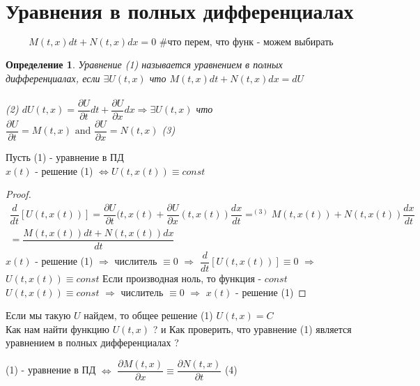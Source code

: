 \documentclass[12pt,a4paper,hidelinks]{article}            %
\newcommand{\pd}[2]{\dfrac{\partial #1}{\partial #2}}
\newcommand{\dd}[2]{\dfrac{d #1}{d #2}}
\newtheorem*{mdef}{Определение}
\begin{document}
\section{Уравнения в полных дифференциалах}
\begin{equation}\tag{1}
  M(t,x)dt+N(t,x)dx=0  
  \mbox{ \# что перем, что функ - можем выбирать}
\end{equation}
\begin{mdef}
    Уравнение (1) называется уравнением в полных дифференциалах, если $\exists U(t,x)$ что $M(t,x)dt+N(t,x)dx=dU$ \\\\
    (2) $dU(t,x)=\pd{U}{t}dt+\pd{U}{x}dx\Rightarrow\exists U(t,x)$ что $\pd{U}{t}=M(t,x) \mbox{ and } \pd{U}{x}=N(t,x)$ (3)
\end{mdef}

\begin{thm-hand}[1]
    Пусть (1) - уравнение в ПД \\
    $x(t)$ - решение (1) $\Longleftrightarrow U(t,x(t))\equiv const$
\end{thm-hand}
\begin{proof}
    \begin{multline*}
        \dfrac{d}{dt}[U(t,x(t))]=\pd{U}{t}(t,x(t)+\pd{U}{x}(t,x(t))\dd{x}{t}=^{(3)}M(t,x(t))+N(t,x(t))\dd{x}{t}\\=\dfrac{M(t,x(t))dt+N(t,x(t))dx}{dt}
    \end{multline*}
    \boxed{\Longrightarrow} 
    $x(t)$ - решение (1) $\Longrightarrow$ числитель $\equiv 0$ $\Longrightarrow$ $\dfrac{d}{dt}[U(t,x(t))]\equiv0$ $\Longrightarrow$ $U(t,x(t))\equiv const$ Если производная ноль, то функция - $const$ \\
    \boxed{\Longleftarrow}
    $U(t,x(t))\equiv const$ $\Longrightarrow$ числитель $\equiv 0$ $\Longrightarrow$ $x(t)$ - решение (1)
\end{proof}
Если мы такую $U$ найдем, то общее решение (1) $U(t,x)=C$ \\
Как нам найти функцию $U(t,x)$ ? и Как проверить, что уравнение (1) является уравнением в полных дифференциалах ? \\
\begin{thm-hand}[2]
    (1) - уравнение в ПД $\Longleftrightarrow$ $\pd{M(t,x)}{x}\equiv \pd{N(t,x)}{t}$ (4)
\end{thm-hand}
\end{document}
